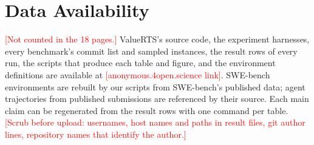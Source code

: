 \documentclass[acmsmall,screen,review,anonymous]{acmart}
\newcommand{\ph}[1]{\textcolor{red}{[#1]}}
\newcommand{\tool}{ValueRTS\xspace}
\begin{document}
\section*{Data Availability}
\ph{Not counted in the 18 pages.} \tool's source code, the experiment harnesses, every benchmark's commit list and sampled instances, the result rows of every run, the scripts that produce each table and figure, and the environment definitions are available at \ph{anonymous.4open.science link}. SWE-bench environments are rebuilt by our scripts from SWE-bench's published data; agent trajectories from published submissions are referenced by their source. Each main claim can be regenerated from the result rows with one command per table. \ph{Scrub before upload: usernames, host names and paths in result files, git author lines, repository names that identify the author.}



\end{document}
